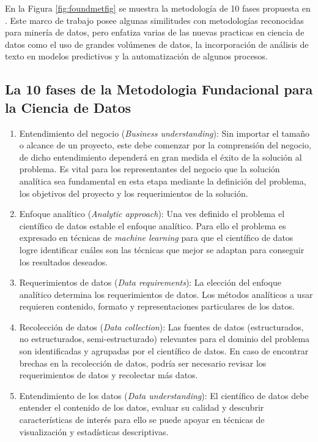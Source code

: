     En la Figura \ref{fig:foundmetfig} se muestra la metodología de 10 fases propuesta en \cite{foundationalmet}. Este marco de trabajo posee algunas similitudes con metodologías reconocidas para minería de datos, pero enfatiza varias de las nuevas practicas en ciencia de datos como el uso de grandes volúmenes de datos, la incorporación de análisis de texto en modelos predictivos y la automatización de algunos procesos.

    \subsection{La 10 fases de la Metodologia Fundacional para la Ciencia de Datos}
    \begin{enumerate}
        \item Entendimiento del negocio (\emph{Business understanding}): Sin importar el tamaño o alcance de un proyecto, este debe comenzar por la comprensión del negocio, de dicho entendimiento dependerá en gran medida el éxito de la solución al problema. Es vital para los representantes del negocio que la solución analítica sea fundamental en esta etapa mediante la definición del problema, los objetivos del proyecto y los requerimientos de la solución.
        \item Enfoque analítico (\emph{Analytic approach}): Una ves definido el problema el científico de datos estable el enfoque analítico. Para ello el problema es expresado en técnicas de \emph{machine learning} para que  el científico de datos logre identificar cuáles son las técnicas que mejor se adaptan para conseguir los resultados deseados.
        \item Requerimientos de datos (\emph{Data requirements}): La elección del enfoque analítico determina los requerimientos de datos. Los métodos analíticos a usar requieren contenido, formato y representaciones particulares de los datos.
        \item Recolección de datos (\emph{Data collection}): Las fuentes de datos (estructurados, no estructurados, semi-estructurado) relevantes para el dominio del problema son identificadas y agrupadas por el científico de datos. En caso de encontrar brechas en la recolección de datos, podría ser necesario revisar los requerimientos de datos y recolectar más datos.
        \item Entendimiento de los datos (\emph{Data understanding}): El científico de datos debe entender el contenido de los datos, evaluar su calidad y descubrir características de interés para ello se puede apoyar en técnicas de visualización y estadísticas descriptivas.

\end{enumerate}
